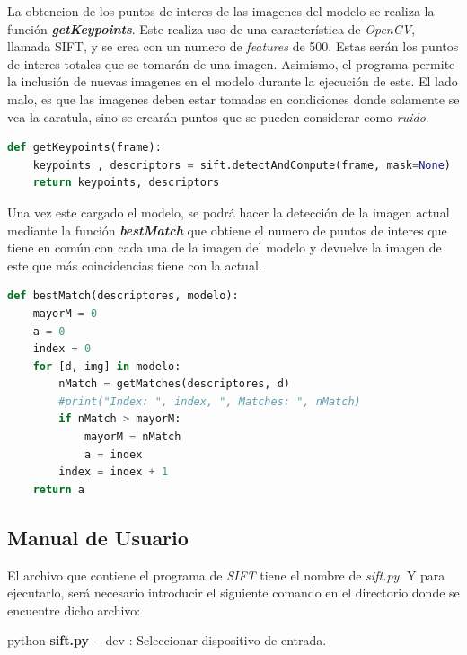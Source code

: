 \documentclass[a4paper]{article} %
\renewcommand{\baselinestretch}{1.5}
\begin{document}
La obtencion de los puntos de interes de las imagenes del modelo se realiza la función \textbf{\textit{getKeypoints}}. Este realiza uso de una característica de \textit{OpenCV}, llamada SIFT, y se crea con un numero de \textit{features} de 500. Estas serán los puntos de interes totales que se tomarán de una imagen. Asimismo, el programa permite la inclusión de nuevas imagenes en el modelo durante la ejecución de este. El lado malo, es que las imagenes deben estar tomadas en condiciones donde solamente se vea la caratula, sino se crearán puntos que se pueden considerar como \textit{ruido}.
\\
\renewcommand{\baselinestretch}{1}
\begin{tcolorbox}[]
\begin{lstlisting}[language=Python]
def getKeypoints(frame):
    keypoints , descriptors = sift.detectAndCompute(frame, mask=None)
    return keypoints, descriptors
\end{lstlisting}
\end{tcolorbox}
\renewcommand{\baselinestretch}{1.5}

Una vez este cargado el modelo, se podrá hacer la detección de la imagen actual mediante la función \textbf{\textit{bestMatch}} que obtiene el numero de puntos de interes que tiene en común con cada una de la imagen del modelo y devuelve la imagen de este que más coincidencias tiene con la actual.
\\
\renewcommand{\baselinestretch}{1}
\begin{tcolorbox}[]
\begin{lstlisting}[language=Python]
def bestMatch(descriptores, modelo):
    mayorM = 0
    a = 0
    index = 0
    for [d, img] in modelo:
        nMatch = getMatches(descriptores, d)
        #print("Index: ", index, ", Matches: ", nMatch)
        if nMatch > mayorM:
            mayorM = nMatch
            a = index
        index = index + 1
    return a
\end{lstlisting}
\end{tcolorbox}
\renewcommand{\baselinestretch}{1.5}


\subsection*{Manual de Usuario}

El archivo que contiene el programa de \textit{SIFT} tiene el nombre de \textit{sift.py}. Y para ejecutarlo, será necesario introducir el siguiente comando en el directorio donde se encuentre dicho archivo:
\\
\begin{tcolorbox}[collower=red!75!black]
python \textbf{sift.py}
\tcblower
- -dev : Seleccionar dispositivo de entrada.
\end{tcolorbox}
\end{document}
